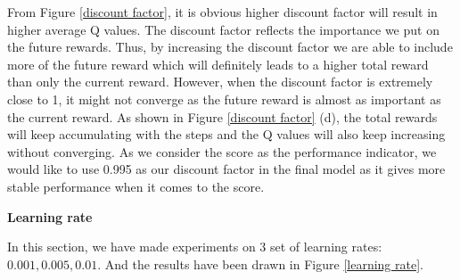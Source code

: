 \documentclass{article}
\begin{document}
From Figure \ref{discount factor}, it is obvious higher discount factor will result in higher average Q
values. The discount factor reflects the importance we put on the future rewards. Thus, by increasing
the discount factor we are able to include more of the future reward which will definitely leads to a
higher total reward than only the current reward. However, when the discount factor is extremely close
to 1, it might not converge as the future reward is almost as important as the current reward. As shown
in Figure \ref{discount factor} (d), the total rewards will keep accumulating with the steps and the Q values
will also keep increasing without converging. As we consider the score as the performance indicator, we
would like to use 0.995 as our discount factor in the final model as it gives more stable performance when it comes to the
score.

\textbf{Learning rate}

In this section, we have made experiments on 3 set of learning rates: $0.001,0.005,0.01$.
And the results have been drawn in Figure \ref{learning rate}.
\end{document}
